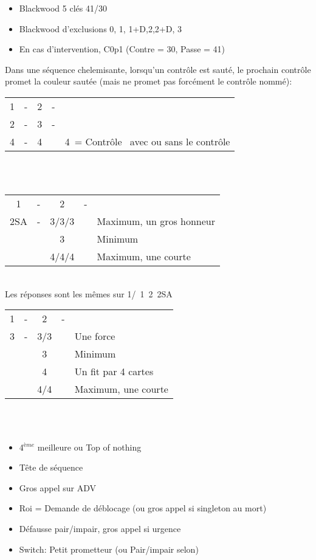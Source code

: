 \documentclass[a4paper, oneside, 11pt]{report}
\begin{document}
	\begin{itemize}
	\item Blackwood 5 clés 41/30
	\item Blackwood d'exclusions 0, 1, 1+D,2,2+D, 3
	\item En cas d'intervention,  C0p1 (Contre = 30,  Passe = 41)\\
	\end{itemize}

	Dans une séquence chelemisante,  lorsqu'un contrôle est sauté,  le prochain contrôle promet la couleur sautée (mais ne promet pas forcément le contrôle nommé):\\
	\begin{tabular}{cccc|l}
	1\pique & -  & 2\trefle & - &\\
	2\pique & - & 3\pique & - &\\
	4\carreau & - & 4\coeur && 4\coeur\ = Contrôle \trefle\ avec ou sans le contrôle \coeur\\
	\end{tabular}\\\\

	\begin{tabular}{cccc|l}
	1\pique & -  & 2\pique & - &\\
	2SA & - & 3\trefle/3\carreau/3\coeur && Maximum,  un gros honneur\\
	&& 3\pique && Minimum\\
	&& 4\trefle/4\carreau/4\coeur && Maximum,  une courte\\
	\end{tabular}\\
	Les réponses sont les mêmes sur 1\trefle/\carreau\ 1\pique\ 2\pique\ 2SA\\

	\begin{tabular}{cccc|l}
	1\pique & -  & 2\pique & - &\\
	3\trefle & - & 3\carreau/3\coeur && Une force\\
	&& 3\pique && Minimum\\
	&& 4\trefle && Un fit par 4 cartes\\
	&& 4\carreau/4\coeur && Maximum,  une courte\\
	\end{tabular}\\\\

		\begin{itemize}
		\item 4$^{ème}$ meilleure ou Top of nothing
		\item Tête de séquence
		\item Gros appel sur ADV
		\item Roi = Demande de déblocage (ou gros appel si singleton au mort)
		\item Défausse pair/impair,  gros appel si urgence
		\item Switch: Petit prometteur (ou Pair/impair selon)\\
		\end{itemize}
\end{document}
